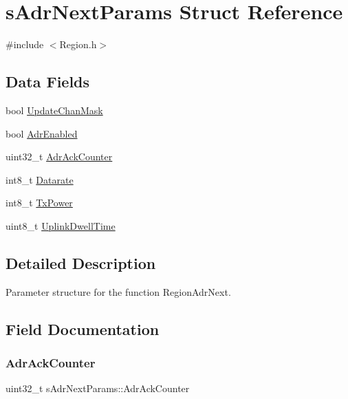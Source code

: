 \hypertarget{structsAdrNextParams}{}\section{s\+Adr\+Next\+Params Struct Reference}
\label{structsAdrNextParams}


{\ttfamily \#include $<$Region.\+h$>$}

\subsection*{Data Fields}
\begin{DoxyCompactItemize}
\item 
bool \hyperlink{structsAdrNextParams_a19a2e867d2da58e8dc49a66895ffabc3}{Update\+Chan\+Mask}
\item 
bool \hyperlink{structsAdrNextParams_af672081d323c0ec3c4795cb4f31645a6}{Adr\+Enabled}
\item 
uint32\+\_\+t \hyperlink{structsAdrNextParams_a4c1177ddf9c60362d3593708e4c95634}{Adr\+Ack\+Counter}
\item 
int8\+\_\+t \hyperlink{structsAdrNextParams_aca7c92b0daeece909a485360c3d22736}{Datarate}
\item 
int8\+\_\+t \hyperlink{structsAdrNextParams_abf2315e4c1e376ed61ba8a58544b45c0}{Tx\+Power}
\item 
uint8\+\_\+t \hyperlink{structsAdrNextParams_ac48a8e1de3148431a68b39b072dcfb5d}{Uplink\+Dwell\+Time}
\end{DoxyCompactItemize}


\subsection{Detailed Description}
Parameter structure for the function Region\+Adr\+Next. 

\subsection{Field Documentation}
\mbox{\label{structsAdrNextParams_a4c1177ddf9c60362d3593708e4c95634}} 
\subsubsection{\texorpdfstring{Adr\+Ack\+Counter}{AdrAckCounter}}
{\footnotesize\ttfamily uint32\+\_\+t s\+Adr\+Next\+Params\+::\+Adr\+Ack\+Counter}


